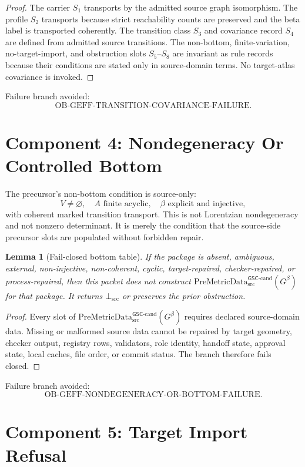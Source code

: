 \documentclass[11pt]{article}
\newcommand{\PreMetricData}{\mathrm{PreMetricData}_{\mathrm{src}}^{\mathsf{GSC}\mbox{-}\mathrm{cand}}}
\newcommand{\BottomSrc}{\bot_{\mathrm{src}}}
\newcommand{\Gbeta}{G^\beta}
\newcommand{\OBGEFF}{\mathrm{OB\mbox{-}GEFF}}
\newtheorem{lemma}{Lemma}
\begin{document}
\begin{proof}
The carrier \(S_1\) transports by the admitted source graph isomorphism. The
profile \(S_2\) transports because strict reachability counts are preserved
and the beta label is transported coherently. The transition class \(S_3\) and
covariance record \(S_4\) are defined from admitted source transitions. The
non-bottom, finite-variation, no-target-import, and obstruction slots
\(S_5\)--\(S_8\) are invariant as rule records because their conditions are
stated only in source-domain terms. No target-atlas covariance is invoked.
\end{proof}

Failure branch avoided:
\[
  \OBGEFF\text{-TRANSITION-COVARIANCE-FAILURE}.
\]

\section{Component 4: Nondegeneracy Or Controlled Bottom}

The precursor's non-bottom condition is source-only:
\[
  V\ne\varnothing,\quad A\text{ finite acyclic},\quad \beta\text{ explicit and injective},
\]
with coherent marked transition transport. This is not Lorentzian
nondegeneracy and not nonzero determinant. It is merely the condition that the
source-side precursor slots are populated without forbidden repair.

\begin{lemma}[Fail-closed bottom table]
If the package is absent, ambiguous, external, non-injective, non-coherent,
cyclic, target-repaired, checker-repaired, or process-repaired, then this
packet does not construct \(\PreMetricData(\Gbeta)\) for that package. It
returns \(\BottomSrc\) or preserves the prior obstruction.
\end{lemma}

\begin{proof}
Every slot of \(\PreMetricData(\Gbeta)\) requires declared source-domain
data. Missing or malformed source data cannot be repaired by target geometry,
checker output, registry rows, validators, role identity, handoff state,
approval state, local caches, file order, or commit status. The branch
therefore fails closed.
\end{proof}

Failure branch avoided:
\[
  \OBGEFF\text{-NONDEGENERACY-OR-BOTTOM-FAILURE}.
\]

\section{Component 5: Target Import Refusal}
\end{document}
